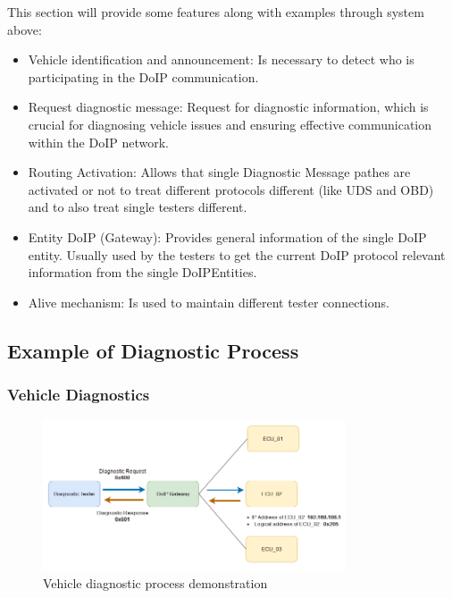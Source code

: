 This section will provide some features along with examples through system above:
\begin{itemize}

    \item Vehicle identification and announcement: Is necessary to detect who is participating in the DoIP communication.

    \item Request diagnostic message: Request for diagnostic information, which is crucial for diagnosing vehicle issues 
    and ensuring effective communication within the DoIP network.

    \item Routing Activation: Allows that single Diagnostic Message pathes are activated or not to treat different protocols 
    different (like UDS and OBD) and to also treat single testers different.
        
    \item Entity DoIP (Gateway): Provides general information of the single DoIP entity. Usually used by the testers to get the
     current DoIP protocol relevant information from the single DoIPEntities.

    \item Alive mechanism: Is used to maintain different tester connections.

\end{itemize}

    \subsection{Example of Diagnostic Process}

        \subsubsection{Vehicle Diagnostics}

            \begin{figure}[htbp]
                \centering
                \includegraphics[width=0.8\textwidth]{./pictures/demo-vehicle-diagnostic.png}
                \caption{Vehicle diagnostic process demonstration}
                \label{fig:2.3}
            \end{figure}

